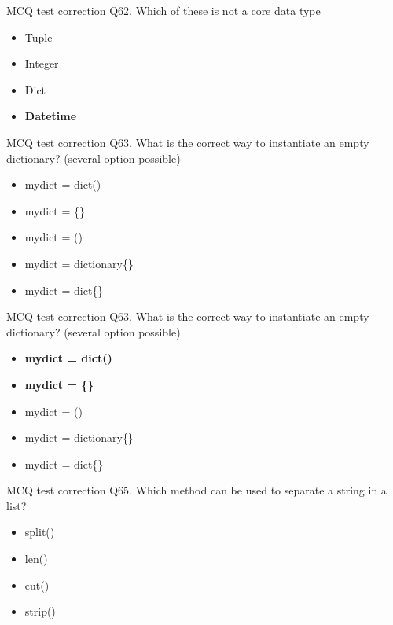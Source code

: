 \documentclass[
  8pt,
  ignorenonframetext,
]{beamer}
\providecommand{\tightlist}{%
  \setlength{\itemsep}{0pt}\setlength{\parskip}{0pt}}
\begin{document}
\begin{frame}{MCQ test correction}
\protect\hypertarget{mcq-test-correction-125}{}
Q62. Which of these is not a core data type

\begin{itemize}
\tightlist
\item
  Tuple
\item
  Integer
\item
  Dict
\item
  \textbf{Datetime}
\end{itemize}
\end{frame}

\begin{frame}{MCQ test correction}
\protect\hypertarget{mcq-test-correction-126}{}
Q63. What is the correct way to instantiate an empty dictionary?
(several option possible)

\begin{itemize}
\tightlist
\item
  mydict = dict()
\item
  mydict = \{\}
\item
  mydict = ()
\item
  mydict = dictionary\{\}
\item
  mydict = dict\{\}
\end{itemize}
\end{frame}

\begin{frame}{MCQ test correction}
\protect\hypertarget{mcq-test-correction-127}{}
Q63. What is the correct way to instantiate an empty dictionary?
(several option possible)

\begin{itemize}
\tightlist
\item
  \textbf{mydict = dict()}
\item
  \textbf{mydict = \{\}}
\item
  mydict = ()
\item
  mydict = dictionary\{\}
\item
  mydict = dict\{\}
\end{itemize}
\end{frame}

\begin{frame}{MCQ test correction}
\protect\hypertarget{mcq-test-correction-128}{}
Q65. Which method can be used to separate a string in a list?

\begin{itemize}
\tightlist
\item
  split()
\item
  len()
\item
  cut()
\item
  strip()
\end{itemize}
\end{frame}
\end{document}
